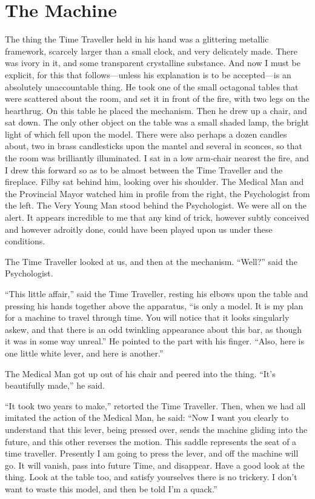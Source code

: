 \documentclass[../book]{subfiles}
\begin{document}
\chapter{The Machine}


The thing the Time Traveller held in his hand was a glittering metallic framework, scarcely larger than a small clock, and very delicately made. There was ivory in it, and some transparent crystalline substance. And now I must be explicit, for this that follows—unless his explanation is to be accepted—is an absolutely unaccountable thing. He took one of the small octagonal tables that were scattered about the room, and set it in front of the fire, with two legs on the hearthrug. On this table he placed the mechanism. Then he drew up a chair, and sat down. The only other object on the table was a small shaded lamp, the bright light of which fell upon the model. There were also perhaps a dozen candles about, two in brass candlesticks upon the mantel and several in sconces, so that the room was brilliantly illuminated. I sat in a low arm-chair nearest the fire, and I drew this forward so as to be almost between the Time Traveller and the fireplace. Filby sat behind him, looking over his shoulder. The Medical Man and the Provincial Mayor watched him in profile from the right, the Psychologist from the left. The Very Young Man stood behind the Psychologist. We were all on the alert. It appears incredible to me that any kind of trick, however subtly conceived and however adroitly done, could have been played upon us under these conditions.

The Time Traveller looked at us, and then at the mechanism. “Well?” said the Psychologist.

“This little affair,” said the Time Traveller, resting his elbows upon the table and pressing his hands together above the apparatus, “is only a model. It is my plan for a machine to travel through time. You will notice that it looks singularly askew, and that there is an odd twinkling appearance about this bar, as though it was in some way unreal.” He pointed to the part with his finger. “Also, here is one little white lever, and here is another.”

The Medical Man got up out of his chair and peered into the thing. “It’s beautifully made,” he said.

“It took two years to make,” retorted the Time Traveller. Then, when we had all imitated the action of the Medical Man, he said: “Now I want you clearly to understand that this lever, being pressed over, sends the machine gliding into the future, and this other reverses the motion. This saddle represents the seat of a time traveller. Presently I am going to press the lever, and off the machine will go. It will vanish, pass into future Time, and disappear. Have a good look at the thing. Look at the table too, and satisfy yourselves there is no trickery. I don’t want to waste this model, and then be told I’m a quack.”
\end{document}
